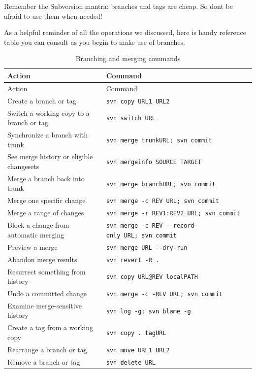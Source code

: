 Remember the Subversion mantra: branches and tags are cheap. So
don\textquotesingle t be afraid to use them when needed!

As a helpful reminder of all the operations we discussed, here is handy
reference table you can consult as you begin to make use of branches.

\begin{longtable}[]{@{}>{\raggedright\arraybackslash}p{}>{\raggedright\arraybackslash}p{}@{}}
\caption{Branching and merging
commands}\label{svn.branchmerge.summary.tbl-1}\tabularnewline
\toprule\noalign{}
Action & Command \\
\midrule\noalign{}
\endfirsthead
\toprule\noalign{}
Action & Command \\
\midrule\noalign{}
\endhead
\bottomrule\noalign{}
\endlastfoot
Create a branch or tag & \texttt{svn\ copy\ URL1\ URL2} \\
Switch a working copy to a branch or tag & \texttt{svn\ switch\ URL} \\
Synchronize a branch with trunk &
\texttt{svn\ merge\ trunkURL;\ svn\ commit} \\
See merge history or eligible changesets &
\texttt{svn\ mergeinfo\ SOURCE\ TARGET} \\
Merge a branch back into trunk &
\texttt{svn\ merge\ branchURL;\ svn\ commit} \\
Merge one specific change &
\texttt{svn\ merge\ -c\ REV\ URL;\ svn\ commit} \\
Merge a range of changes &
\texttt{svn\ merge\ -r\ REV1:REV2\ URL;\ svn\ commit} \\
Block a change from automatic merging &
\texttt{svn\ merge\ -c\ REV\ -\/-record-only\ URL;\ svn\ commit} \\
Preview a merge & \texttt{svn\ merge\ URL\ -\/-dry-run} \\
Abandon merge results & \texttt{svn\ revert\ -R\ .} \\
Resurrect something from history &
\texttt{svn\ copy\ URL@REV\ localPATH} \\
Undo a committed change &
\texttt{svn\ merge\ -c\ -REV\ URL;\ svn\ commit} \\
Examine merge-sensitive history &
\texttt{svn\ log\ -g;\ svn\ blame\ -g} \\
Create a tag from a working copy & \texttt{svn\ copy\ .\ tagURL} \\
Rearrange a branch or tag & \texttt{svn\ move\ URL1\ URL2} \\
Remove a branch or tag & \texttt{svn\ delete\ URL} \\
\end{longtable}

